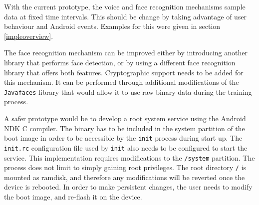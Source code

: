With the current prototype, the voice and face recognition mechanisms sample data at fixed time intervals. This should be change by taking advantage of user behaviour and Android events. Examples for this were given in section \ref{impleoverview}. 

The face recognition mechanism can be improved either by introducing another library that performs face detection, or by using a different face recognition library that offers both features. Cryptographic support needs to be added for this mechanism. It can be performed through additional modifications of the {\tt Javafaces} library that would allow it to use raw binary data during the training process.

A safer prototype would be to develop a root system service using the Android NDK C compiler. The binary has to be included in the system partition of the boot image in order to be accessible by the {\tt init} process during start up. The {\tt init.rc} configuration file used by {\tt init} also needs to be configured to start the service. This implementation requires modifications to the {\tt /system} partition. The process does not limit to simply gaining root privileges. The root directory {\tt /} is mounted as ramdisk, and therefore any modifications will be reverted once the device is rebooted. In order to make persistent changes, the user needs to modify the boot image, and re-flash it on the device.
